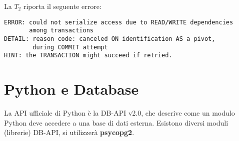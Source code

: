 \documentclass[a4paper, 10pt, titlepage]{article}
\begin{document}
		La $ T_2 $ riporta il seguente errore:
		\begin{lstlisting}
ERROR: could not serialize access due to READ/WRITE dependencies 
       among transactions
DETAIL: reason code: canceled ON identification AS a pivot, 
        during COMMIT attempt
HINT: the TRANSACTION might succeed if retried.
		\end{lstlisting}
	
	\newpage
	
\section{Python e Database}
	La API ufficiale di Python è la DB-API v2.0, che descrive come un modulo Python deve accedere a una base di dati esterna. Esistono diversi moduli (librerie) DB-API, si utilizzerà \textbf{psycopg2}.
\end{document}
